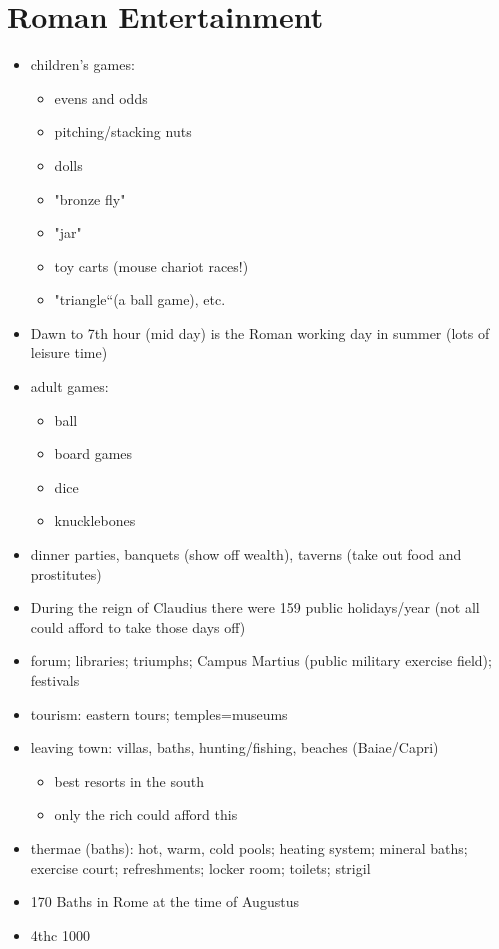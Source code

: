 \documentclass[12pt, twoside]{article}
\begin{document}
\section{Roman Entertainment}
\begin{itemize}
\item children's games:
	\begin{itemize}
	\item evens and odds
	\item pitching/stacking nuts
	\item dolls
	\item "bronze fly"
	\item "jar"
	\item toy carts (mouse chariot races!)
	\item "triangle“(a ball game), etc.
	\end{itemize}
\item Dawn to 7th hour (mid day) is the Roman working day in summer (lots of leisure time)
\item adult games:
	\begin{itemize}
	\item ball
	\item board games
	\item dice
	\item knucklebones
	\end{itemize}
\item dinner parties, banquets (show off wealth), taverns (take out food and prostitutes)
\item During the reign of Claudius there were 159 public holidays/year (not all could afford to take those days off)
\item forum; libraries; triumphs; Campus Martius (public military exercise field); festivals
\item tourism: eastern tours; temples=museums
\item leaving town: villas, baths, hunting/fishing, beaches (Baiae/Capri)
	\begin{itemize}
	\item best resorts in the south
	\item only the rich could afford this
	\end{itemize}
\item thermae (baths): hot, warm, cold pools; heating system; mineral baths; exercise court; refreshments; locker room; toilets; strigil
\item 170 Baths in Rome at the time of Augustus
\item 4thc 1000

\end{itemize}
\end{document}
